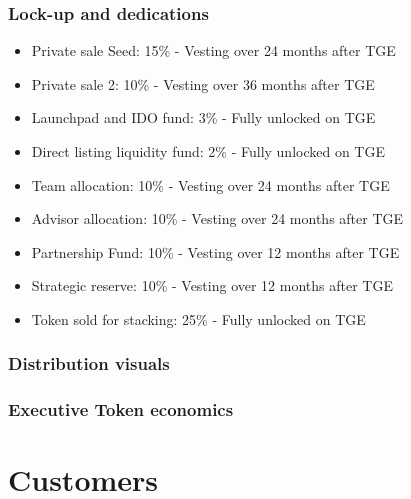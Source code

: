 ﻿\documentclass[a4paper]{article}
\begin{document}
\subsubsection{Lock-up and dedications}

\begin{itemize}
\item Private sale Seed: 15\% - Vesting over 24 months after TGE

\item Private sale 2: 10\% - Vesting over 36 months after TGE

\item Launchpad and IDO fund: 3\% - Fully unlocked on TGE

\item Direct listing liquidity fund: 2\% - Fully unlocked on TGE

\item Team allocation: 10\% - Vesting over 24 months after TGE

\item Advisor allocation: 10\% - Vesting over 24 months after TGE

\item Partnership Fund: 10\% - Vesting over 12 months after TGE

\item Strategic reserve: 10\% - Vesting over 12 months after TGE

\item Token sold for stacking: 25\% - Fully unlocked on TGE
\end{itemize}


\subsubsection{Distribution visuals}


  

  





\subsubsection{Executive Token economics}


\section{Customers}
\end{document}
